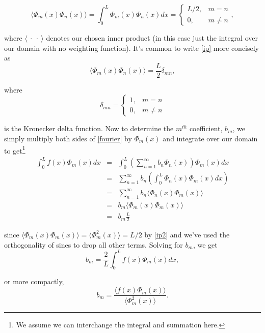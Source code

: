 \documentclass[11pt]{article}
\numberwithin{equation}{section}
\begin{document}
\begin{equation}
\langle \Phi_m(x) \Phi_n(x) \rangle = \int_0^L \Phi_m(x) \Phi_n(x) dx = 
  \begin{cases}
    L/2, & m = n \\
    0, & m \neq n
  \end{cases}, \label{ip}
\end{equation}

where $\langle \ \cdot \ \cdot \ \rangle$ denotes our chosen inner product (in this case just the integral over our domain with no weighting function). It's common to write \eqref{ip} more concisely as
\begin{equation}
\langle \Phi_m(x) \Phi_n(x) \rangle = \frac{L}{2} \delta_{mn}, \label{ip2}
\end{equation}

where
\begin{equation*}
\delta_{mn} =
  \begin{cases}
    1, & m = n \\
    0, & m \neq n
  \end{cases}
\end{equation*}

is the Kronecker delta function. Now to determine the $m^{th}$ coefficient, $b_m$, we simply multiply both sides of \eqref{fourier} by $\Phi_m(x)$ and integrate over our domain to get\footnote{We assume we can interchange the integral and summation here.} 
\begin{eqnarray*}
\int_0^L f(x) \Phi_m(x) dx & = & \int_0^L \left( \sum_{n = 1}^{\infty} b_n \Phi_n(x) \right) \Phi_m(x) dx \\
& = & \sum_{n = 1}^{\infty}  b_n  \left( \int_0^L \Phi_n(x) \Phi_m(x) dx \right) \\
& = & \sum_{n = 1}^{\infty}  b_n  \langle \Phi_n(x) \Phi_m(x) \rangle \\
& = & b_m  \langle \Phi_m(x) \Phi_m(x) \rangle \\
& = & b_m  \frac{L}{2}
\end{eqnarray*}

since $\langle \Phi_m(x) \Phi_m(x) \rangle = \langle \Phi_m^2(x) \rangle = L/2$ by \eqref{ip2} and we've used the orthogonality of sines to drop all other terms. Solving for $b_m$, we get
\begin{equation}
b_m = \frac{2}{L} \int_0^L f(x) \Phi_m(x) dx,
\end{equation}

or more compactly, 
\begin{equation}
b_m = \frac{\langle f(x) \Phi_m(x) \rangle }{\langle \Phi_m^2(x) \rangle}. \label{fourier_coef}
\end{equation}
\end{document}
